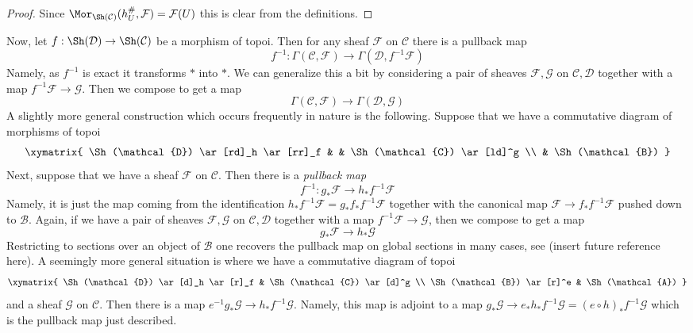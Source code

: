 \begin{proof}
Since $\Mor_{\Sh(\mathcal{C})}(h_U^\#, \mathcal{F}) = \mathcal{F}(U)$
this is clear from the definitions.
\end{proof}

\noindent
Now, let $f : \Sh(\mathcal{D}) \to \Sh(\mathcal{C})$ be a
morphism of topoi. Then for any sheaf $\mathcal{F}$ on $\mathcal{C}$
there is a pullback map
$$
f^{-1} :
\Gamma(\mathcal{C}, \mathcal{F})
\longrightarrow
\Gamma(\mathcal{D}, f^{-1}\mathcal{F})
$$
Namely, as $f^{-1}$ is exact it transforms $*$ into $*$. We can generalize
this a bit by considering a pair of sheaves $\mathcal{F}, \mathcal{G}$
on $\mathcal{C}, \mathcal{D}$ together with a map
$f^{-1}\mathcal{F} \to \mathcal{G}$. Then we compose to get a map
$$
\Gamma(\mathcal{C}, \mathcal{F})
\longrightarrow
\Gamma(\mathcal{D}, \mathcal{G})
$$
A slightly more general construction which occurs frequently in nature
is the following. Suppose that we have a commutative diagram of
morphisms of topoi
$$
\xymatrix{
\Sh(\mathcal{D}) \ar[rd]_h \ar[rr]_f & &
\Sh(\mathcal{C}) \ar[ld]^g \\
& \Sh(\mathcal{B})
}
$$
Next, suppose that we have a sheaf $\mathcal{F}$ on $\mathcal{C}$.
Then there is a {\it pullback map}
$$
f^{-1} : g_*\mathcal{F} \longrightarrow h_*f^{-1}\mathcal{F}
$$
Namely, it is just the map coming from the identification
$h_*f^{-1}\mathcal{F} = g_*f_*f^{-1}\mathcal{F}$ together with the canonical
map $\mathcal{F} \to f_*f^{-1}\mathcal{F}$ pushed down to $\mathcal{B}$.
Again, if we have a pair of sheaves $\mathcal{F}, \mathcal{G}$
on $\mathcal{C}, \mathcal{D}$ together with a map
$f^{-1}\mathcal{F} \to \mathcal{G}$, then we compose to get a map
$$
g_*\mathcal{F} \longrightarrow h_*\mathcal{G}
$$
Restricting to sections over an object of $\mathcal{B}$ one recovers
the pullback map on global sections in many cases, see
(insert future reference here). A seemingly more general situation is
where we have a commutative diagram of topoi
$$
\xymatrix{
\Sh(\mathcal{D}) \ar[d]_h \ar[r]_f &
\Sh(\mathcal{C}) \ar[d]^g \\
\Sh(\mathcal{B}) \ar[r]^e & \Sh(\mathcal{A})
}
$$
and a sheaf $\mathcal{G}$ on $\mathcal{C}$. Then there is a map
$e^{-1}g_*\mathcal{G} \to h_*f^{-1}\mathcal{G}$. Namely, this map
is adjoint to a map
$g_*\mathcal{G} \to e_*h_*f^{-1}\mathcal{G} = (e \circ h)_*f^{-1}\mathcal{G}$
which is the pullback map just described.













